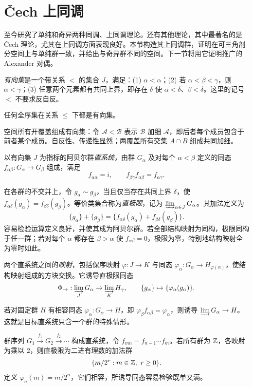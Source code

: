 \section{Čech 上同调}
至今研究了单纯和奇异两种同调、上同调理论。还有其他理论，其中最著名的是 Čech 理论，尤其在上同调方面表现良好。本节构造其上同调群，证明在可三角剖分空间上与单纯群一致，并给出与奇异群不同的空间。下一节将用它证明推广的 Alexander 对偶。

\emph{有向集}是一个带关系 $<$ 的集合 $J$，满足：(1) $\alpha<\alpha$；(2) 若 $\alpha<\beta<\gamma$，则 $\alpha<\gamma$；(3) 任意两个元素都有共同上界，即存在 $\delta$ 使 $\alpha<\delta$、$\beta<\delta$。这里的记号 $<$ 不要求反自反。

任何全序集在关系 $\le$ 下都是有向集。

空间所有开覆盖组成有向集：令 $\mathcal A<\mathcal B$ 表示 $\mathcal B$ 加细 $\mathcal A$，即后者每个成员包含于前者某个成员。自反性、传递性显然；两覆盖所有交集 $A\cap B$ 组成共同加细。

以有向集 $J$ 为指标的阿贝尔群\emph{直系统}，由群 $G_\alpha$ 及对每个 $\alpha<\beta$ 定义的同态 $f_{\alpha\beta}:G_\alpha\to G_\beta$ 组成，满足
\[f_{\alpha\alpha}=i,\qquad f_{\beta\gamma}f_{\alpha\beta}=f_{\alpha\gamma}.\]

在各群的不交并上，令 $g_\alpha\sim g_\beta$，当且仅当存在共同上界 $\delta$，使 $f_{\alpha\delta}(g_\alpha)=f_{\beta\delta}(g_\beta)$。等价类集合称为\emph{直极限}，记为 $\varinjlim_{\alpha\in J}G_\alpha$。其加法定义为
\[\{g_\alpha\}+\{g_\beta\}=\{f_{\alpha\delta}(g_\alpha)+f_{\beta\delta}(g_\beta)\}.\]
容易检验运算定义良好，并使其成为阿贝尔群。若全部结构映射为同构，极限同构于任一群；若对每个 $\alpha$ 都存在 $\beta>\alpha$ 使 $f_{\alpha\beta}=0$，极限为零，特别地结构映射全为零时如此。

两个直系统之间的\emph{映射}，包括保序映射 $\varphi:J\to K$ 与同态 $\varphi_\alpha:G_\alpha\to H_{\varphi(\alpha)}$，使结构映射组成的方块交换。它诱导直极限同态
\[\Phi_\to:\varinjlim_JG_\alpha\to\varinjlim_KH_\gamma,\qquad
\{g_\alpha\}\mapsto\{\varphi_\alpha(g_\alpha)\}.\]

若对固定群 $H$ 有相容同态 $\varphi_\alpha:G_\alpha\to H$，即 $\varphi_\beta f_{\alpha\beta}=\varphi_\alpha$，则诱导 $\varinjlim G_\alpha\to H$。这就是目标直系统只含一个群的特殊情形。

群序列 $G_1\xrightarrow{f_1}G_2\xrightarrow{f_2}\cdots$ 构成直系统，令 $f_{mn}=f_{n-1}\cdots f_m$。若所有群为 $\mathbb{Z}$，各映射为乘以 $2$，则直极限为二进有理数的加法群
\[\{m/2^r:m\in\mathbb{Z},\ r\ge0\}.\]
定义 $\varphi_n(m)=m/2^n$，它们相容，所诱导同态容易检验既单又满。

